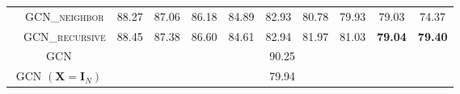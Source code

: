 \begin{table}[!p]
{\begin{tabular}{c|c|ccccccccc}
& \textsc{GCN\_neighbor} & 88.27 & 87.06 & 86.18 & 84.89 & 82.93 & 80.78 & 79.93 & 79.03 & 74.37 \\
& \textsc{GCN\_recursive} & 88.45 & 87.38 & 86.60 & 84.61 & 82.94 & 81.97 & 81.03 & \textbf{79.04} & \textbf{79.40}\\
\midrule
\multicolumn{2}{c|}{GCN}& \multicolumn{9}{c}{90.25}\\
\multicolumn{2}{c|}{GCN $(\mathbf{X} = \mathbf{I}_N)$}& \multicolumn{9}{c}{79.94}\\ 
\bottomrule
    \end{tabular}
    }
\end{table}

